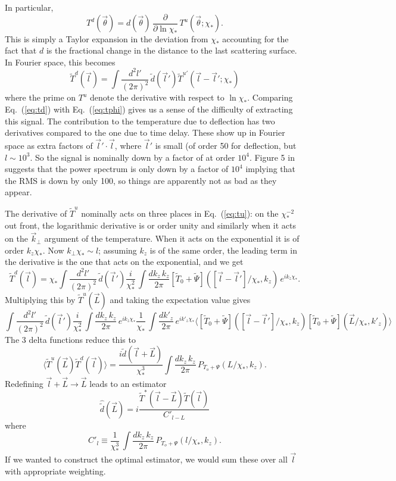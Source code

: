\documentclass[prd,amsmath,amssymb,floatfix,superscriptaddress,nofootinbib,preprintnumbers]{revtex4-1}
\def\be{\begin{equation}}
\def\ee{\end{equation}}
\newcommand{\ec}[1]{Eq.~(\ref{eq:#1})}
\newcommand{\eql}[1]{\label{eq:#1}}
\begin{document}
In particular,
\be
T^d(\vec\theta) = d(\vec\theta)\,\frac{\partial}{\partial\ln\chi_*}\, T^u(\vec\theta;\chi_*).
\ee
This is simply a Taylor expansion in the deviation from $\chi_*$ accounting for the fact that $d$ is the fractional change in the distance to the last scattering surface. In Fourier space, this becomes
\begin{equation}
\tilde T^d(\vec l) = \int \frac{d^2l'}{(2\pi)^2}\, \tilde d(\vec l') \tilde T^{u'}(\vec l-\vec l';\chi_*) %
\eql{td}\end{equation}
where the prime on $T^u$ denote the  derivative with respect to $\ln\chi_*$. Comparing \ec{td} with \ec{tphi}  gives us a sense of the difficulty of extracting this signal. The contribution to the temperature due to deflection has two derivatives compared to the one due to time delay. These show up in Fourier space as extra factors of $\vec l'\cdot\vec l$, where $\vec l'$ is small (of order 50 for deflection, but $l\sim 10^3$. So the signal is nominally down by a factor of at order $10^4$. Figure 5 in \cite{Hu:2001yq} suggests that the power spectrum is only down by a factor of $10^4$ implying that the RMS is down by only 100, so things are apparently not as bad as they appear. %

The derivative of $\tilde T^u$ nominally acts on three places in \ec{tu}: on the $\chi_*^{-2}$ out front, the logarithmic derivative is or order unity and similarly when it acts on the $\vec k_\perp$ argument of the temperature. When it acts on the exponential it is of order $k_z\chi_*$. Now $k_\perp\chi_*\sim l$; assuming $k_z$ is of the same order, the leading term in the derivative is the one that acts on the exponential, and we get
\begin{equation}
\tilde T^d(\vec l) = \chi_*\int \frac{d^2l'}{(2\pi)^2}\, \tilde d(\vec l')
\frac{i}{\chi_*^2}\, \int \frac{dk_z\,k_z}{2\pi}  [\tilde T_0+\tilde\Psi]([\vec l-\vec l']/\chi_*,k_z)\,e^{ik_z\chi_*}.
\end{equation}
Multiplying this by $\tilde T^u(\vec L)$ and taking the expectation value gives
\be
\int \frac{d^2l'}{(2\pi)^2}\, \tilde d(\vec l')
\frac{i}{\chi_*^2}\, \int \frac{dk_z\,k_z}{2\pi}  \,e^{ik_z\chi_*}
\frac{1}{\chi_*}\, \int \frac{dk'_z}{2\pi} \,e^{ik'_z\chi_*}
 \langle [\tilde T_0+\tilde\Psi]([\vec l-\vec l']/\chi_*,k_z)  [\tilde T_0+\tilde\Psi](\vec L/\chi_*,k'_z)\rangle
 \ee
 The 3 delta functions reduce this to
 \be
 \langle \tilde T^u(\vec L) \tilde T^d(\vec l) \rangle
 = \frac{i\tilde d(\vec l + \vec L)}{\chi_*^3} \int \frac{dk_z\,k_z}{2\pi} \, P_{T_o+\Psi}(L/\chi_*,k_z)
. \ee
 Redefining $\vec l + \vec L \rightarrow \vec L$ leads to an estimator
 \be
 \hat{\tilde d}(\vec L) = i \frac{\tilde T^*(\vec l-\vec L) \tilde T(\vec l)}{C'_{l-L}}
 \ee
 where
 \be
 C'_l \equiv  \frac{1}{\chi_*^3}\, \int \frac{dk_z\,k_z}{2\pi} \, P_{T_o+\Psi}(l/\chi_*,k_z)
 .\ee
If we wanted to construct the optimal estimator, we would sum these over all $\vec l$ with appropriate weighting.
\end{document}
